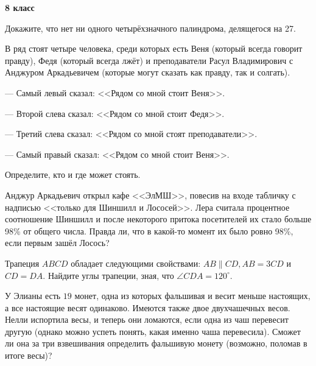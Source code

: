 \hspace{3mm}

\centerline{\bf \Huge 8 класс}

\begin{flushright}
        \scriptsize{}
\end{flushright}

Докажите, что нет ни одного четырёхзначного палиндрома, делящегося на 27.

В ряд стоят четыре человека, среди которых есть Веня (который всегда говорит правду), Федя (который всегда лжёт) и преподаватели Расул Владимирович с Анджуром Аркадьевичем (которые могут сказать как правду, так и солгать).

--- Самый левый сказал: <<Рядом со мной стоит Веня>>.

--- Второй слева сказал: <<Рядом со мной стоит Федя>>.

--- Третий слева сказал: <<Рядом со мной стоят преподаватели>>.

--- Самый правый сказал: <<Рядом со мной стоит Веня>>.

Определите, кто и где может стоять.

Анджур Аркадьевич открыл кафе <<ЭлМШ>>, повесив на входе табличку с надписью <<только для Шиншилл и Лососей>>. Лера считала процентное соотношение Шиншилл и после некоторого притока посетителей их стало больше 98\% от общего числа. Правда ли, что в какой-то момент их было ровно 98\%, если первым зашёл Лосось?

Трапеция $A B C D$ обладает следующими свойствами: $A B \| C D, A B=3 C D$ и $C D=D A$. Найдите углы трапеции, зная, что $\angle C D A=120^{\circ}$.

У Элианы есть $19$ монет, одна из которых фальшивая и весит меньше настоящих, а все настоящие весят одинаково. Имеются также двое двухчашечных весов. Нелли испортила весы, и теперь они ломаются, если одна из чаш перевесит другую (однако можно успеть понять, какая именно чаша перевесила). Сможет ли она за три взвешивания определить фальшивую монету (возможно, поломав в итоге весы)?